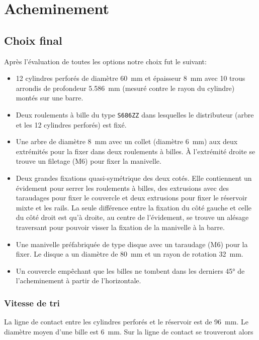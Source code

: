 \section{Acheminement}
\subsection{Choix final}
Après l'évaluation de toutes les options notre choix fut le suivant:
\begin{itemize}
	\item \num{12} cylindres perforés de diamètre \SI{60}{\milli\metre} et épaisseur \SI{8}{\milli\metre} avec \num{10} trous arrondis de profondeur \SI{5.586}{\milli\metre} (mesuré contre le rayon du cylindre) montés sur une barre.
	\item Deux roulements à bille du type \texttt{S686ZZ} dans lesquelles le distributeur (arbre et les \num{12} cylindres perforés) est fixé.
	\item Une arbre de diamètre \SI{8}{\milli\metre} avec un collet (diamètre \SI{6}{\milli\metre}) aux deux extrémités pour la fixer dans deux roulements à billes. À l'extrémité droite se trouve un filetage (M6) pour fixer la manivelle.
	\item Deux grandes fixations quasi-symétrique des deux cotés. Elle contiennent un évidement pour serrer les roulements à billes, des extrusions avec des taraudages pour fixer le couvercle et deux extrusions pour fixer le réservoir mixte et les rails. La seule différence entre la fixation du côté gauche et celle du côté droit est qu'à droite, au centre de l'évidement, se trouve un alésage traversant pour pouvoir visser la fixation de la manivelle à la barre.
	\item Une manivelle préfabriquée de type disque avec un taraudage (M6) pour la fixer. Le disque a un diamètre de \SI{80}{\milli\metre} et un rayon de rotation  \SI{32}{\milli\metre}.
	\item Un couvercle empêchant que les billes ne tombent dans les derniers \ang{45} de l'acheminement à partir de l'horizontale.
\end{itemize}


\subsubsection{Vitesse de tri}
La ligne de contact entre les cylindres perforés et le réservoir est de \SI{96}{\milli\metre}. Le diamètre moyen d'une bille est \SI{6}{\milli\metre}. Sur la ligne de contact se trouveront alors

